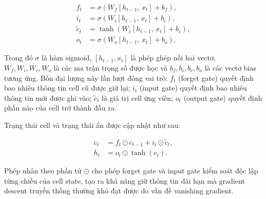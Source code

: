 \begin{align}
    f_t &= \sigma\!\left(W_f [h_{t-1},\, x_t] + b_f\right), \label{eq:lstm_forget} \\
    i_t &= \sigma\!\left(W_i [h_{t-1},\, x_t] + b_i\right), \label{eq:lstm_input} \\
    \tilde{c}_t &= \tanh\!\left(W_c [h_{t-1},\, x_t] + b_c\right), \label{eq:lstm_candidate} \\
    o_t &= \sigma\!\left(W_o [h_{t-1},\, x_t] + b_o\right). \label{eq:lstm_output}
\end{align}

Trong đó $\sigma$ là hàm sigmoid, $[h_{t-1}, x_t]$ là phép ghép nối hai vectơ, $W_f, W_i, W_c, W_o$ là các ma trận trọng số được học và $b_f, b_i, b_c, b_o$ là các vectơ bias tương ứng. Bốn đại lượng này lần lượt đóng vai trò: $f_t$ (forget gate) quyết định bao nhiêu thông tin cell cũ được giữ lại; $i_t$ (input gate) quyết định bao nhiêu thông tin mới được ghi vào; $\tilde{c}_t$ là giá trị cell ứng viên; $o_t$ (output gate) quyết định phần nào của cell trở thành đầu ra.

Trạng thái cell và trạng thái ẩn được cập nhật như sau:

\begin{align}
    c_t &= f_t \odot c_{t-1} + i_t \odot \tilde{c}_t, \label{eq:lstm_cell} \\
    h_t &= o_t \odot \tanh(c_t). \label{eq:lstm_hidden}
\end{align}

Phép nhân theo phần tử $\odot$ cho phép forget gate và input gate kiểm soát độc lập từng chiều của cell state, tạo ra khả năng giữ thông tin dài hạn mà gradient descent truyền thống thường khó đạt được do vấn đề vanishing gradient.

